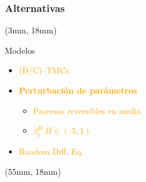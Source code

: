 \begin{frame}
    \frametitle{Alternativas}
    \begin{textblock*}{50mm}(3mm, 18mm)
        \begin{bluebox}{Modelos}
            \begin{itemize}
                \item
                    \textcolor<1>{orange}{(D/C)--TMCs}
                \item
                    \textcolor<2,3,4,5,7>{orange}{
                    \textbf<4-5,7>{%
                        Perturbación de parámetros
                    }
                }
                \begin{itemize}
                    \item
                        \textcolor<4>{orange}{
                            Procesos
                            reversibles
                            en media
                        }
                    \item
                        \textcolor<5>{orange}{
                            $
                                \beta_t^H \ H \in (\num{.5}, 1)
                            $
                        }
                \end{itemize}
                \item
                    \textcolor<6>{orange}{
                        Random Diff. Eq.
                    }
            \end{itemize}
        \end{bluebox}
    \end{textblock*}
    \begin{textblock*}{72mm}(55mm, 18mm)
       \begin{graybox}
            {%
}
\end{graybox}
\end{textblock*}
\end{frame}

